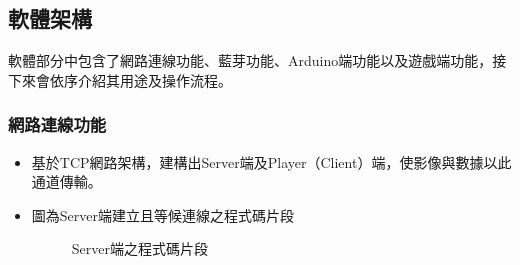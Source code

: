 \documentclass[12pt]{article}  %
\theoremstyle{plain}
\begin{document}
\subsection{軟體架構}
軟體部分中包含了網路連線功能、藍芽功能、Arduino端功能以及遊戲端功能，接下來會依序介紹其用途及操作流程。

\subsubsection{網路連線功能}
\begin{itemize}
\item 基於TCP網路架構，建構出Server端及Player（Client）端，使影像與數據以此通道傳輸。

\item 圖為Server端建立且等候連線之程式碼片段
\begin{figure}[h]  %
\quad
{}
\caption{Server端之程式碼片段}
\end{figure}
\newpage


\end{itemize}
\end{document}
